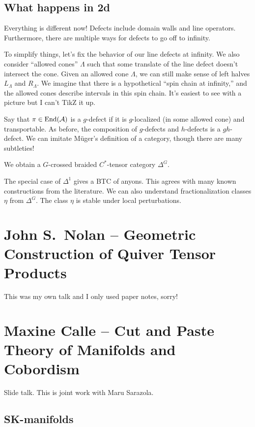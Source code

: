\documentclass{amsart}
\begin{document}
\subsection{What happens in 2d}

Everything is different now!
Defects include domain walls and line operators.
Furthermore, there are multiple ways for defects to go off to infinity.

To simplify things, let's fix the behavior of our line defects at infinity.
We also consider ``allowed cones'' $\Lambda$ such that some translate of the line defect doesn't intersect the cone.
Given an allowed cone $\Lambda$, we can still make sense of left halves $L_\Lambda$ and $R_\Lambda$.
We imagine that there is a hypothetical ``spin chain at infinity,'' and the allowed cones describe intervals in this spin chain.
It's easiest to see with a picture but I can't TikZ it up.

Say that $\pi \in \operatorname{End}(\mathcal{A})$ is a $g$-defect if it is $g$-localized (in some allowed cone) and transportable.
As before, the composition of $g$-defects and $h$-defects is a $gh$-defect.
We can imitate M\"uger's definition of a category, though there are many subtleties!

\begin{thm}
  We obtain a $G$-crossed braided $C^*$-tensor category $\Delta^G$.
\end{thm}

The special case of $\Delta^1$ gives a BTC of anyons.
This agrees with many known constructions from the literature.
We can also understand fractionalization classes $\eta$ from $\Delta^G$.
The class $\eta$ is stable under local perturbations.

\section{John S.\ Nolan -- Geometric Construction of Quiver Tensor Products}

This was my own talk and I only used paper notes, sorry!

\section{Maxine Calle -- Cut and Paste Theory of Manifolds and Cobordism}

Slide talk.
This is joint work with Maru Sarazola.

\subsection{SK-manifolds}
\end{document}
